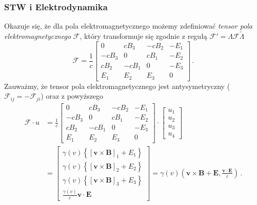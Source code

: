 \documentclass[../main.tex]{subfiles}
\begin{document}
\subsubsection{STW i Elektrodynamika}
Okazuje się, że dla pola elektromagnetycznego możemy zdefiniować \textit{tensor pola
elektromagnetycznego} \(\mathscr{F}\), który transformuje się zgodnie z regułą
\(\mathscr{F}'=\Lambda\mathscr{F}\tilde{\Lambda}\)
\begin{equation*}
    \mathscr{F}=\frac{1}{c}\left[\begin{array}{cccc}
         0&cB_3&-cB_2&-E_1  \\
         -cB_3&0&cB_1&-E_2 \\
         cB_2&-cB_1&0&-E_3 \\
         E_1 &E_2&E_3&0
    \end{array}\right]\,.
\end{equation*}
Zauważmy, że tensor pola elektromagnetycznego jest antysymetryczny
(\(\mathscr{F}_{ij}=-\mathscr{F}_{ji}\)) oraz z powyższego
\begin{equation*}
\begin{split}
    \mathscr{F}\cdot u&=\frac{1}{c}\left[\begin{array}{cccc}
         0&cB_3&-cB_2&-E_1  \\
         -cB_3&0&cB_1&-E_2 \\
         cB_2&-cB_1&0&-E_3 \\
         E_1 &E_2&E_3&0
    \end{array}\right]\cdot \left[\begin{array}{c}
         u_1 \\
         u_2 \\
         u_3 \\
         u_4 
    \end{array}\right]\\
    &=\left[\begin{array}{c}
         \gamma(v)\left\{[\mathbf{v}\times\mathbf{B}]_1+E_1\right\}  \\
         \gamma(v)\left\{[\mathbf{v}\times\mathbf{B}]_2+E_2\right\}  \\
         \gamma(v)\left\{[\mathbf{v}\times\mathbf{B}]_3+E_3\right\}  \\
         \frac{\gamma(v)}{c}\mathbf{v}\cdot\mathbf{E}
    \end{array}\right]=\gamma(v)\left(\mathbf{v}\times\mathbf{B}+\mathbf{E},\frac{\mathbf{v}\cdot\mathbf{E}}{c}\right)\,.
\end{split}
\end{equation*}
\end{document}
